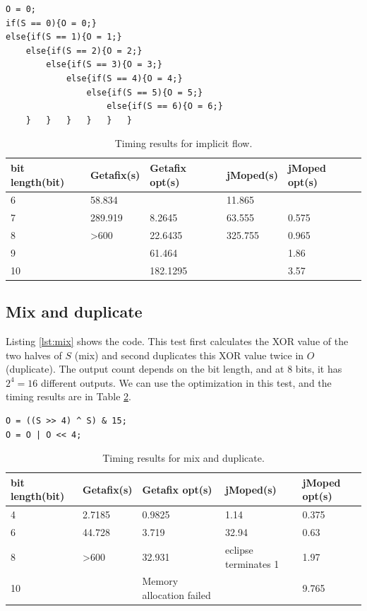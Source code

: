 \lstset{language=C}  
\begin{lstlisting}[float=h, caption={Implict flow test program.},label=lst:implicit]
O = 0;
if(S == 0){O = 0;}
else{if(S == 1){O = 1;}
	else{if(S == 2){O = 2;}
		else{if(S == 3){O = 3;}
			else{if(S == 4){O = 4;}
				else{if(S == 5){O = 5;}
					else{if(S == 6){O = 6;}
	}	}	}	}	}	}
\end{lstlisting}

\begin{table}[htbp]
\begin{tabular}{|l|l|l|l|l|}
\hline
{bit length(bit)} & Getafix(s) & {Getafix opt(s)} & jMoped(s) & {jMoped opt(s)} \\ \hline
6 & {58.834} & {} & {11.865} & {} \\ \hline
7 & {289.919} & 8.2645 & {63.555} & 0.575 \\ \hline
8 & \textgreater 600 & 22.6435 & {325.755} & 0.965 \\ \hline
9 &  & 61.464 &  & 1.86 \\ \hline
10 &  & 182.1295 &  & 3.57 \\ \hline
\end{tabular}
\caption{Timing results for implicit flow.}
\label{tbl:implicit}
\end{table}

\subsection{Mix and duplicate}
Listing \ref{lst:mix} shows the code. This test first calculates the XOR value of the two halves of $S$ (mix) and second duplicates this XOR value twice in $O$ (duplicate). The output count depends on the bit length, and at $8$ bits, it has $2^{4} = 16$ different outputs. We can use the optimization in this test, and the timing results are in Table \ref{tbl:mix}.

\lstset{language=C}  
\begin{lstlisting}[float=h, caption={Mix and duplicate test program at 8 bits.},label=lst:mix]
O = ((S >> 4) ^ S) & 15;
O = O | O << 4;
\end{lstlisting}

\begin{table}[htbp]
\begin{tabular}{|l|l|l|l|l|}
\hline
{bit length(bit)} & Getafix(s) & {Getafix opt(s)} & jMoped(s) & {jMoped opt(s)} \\ \hline
4 & {2.7185} & 0.9825 & {1.14} & 0.375 \\ \hline
6 & {44.728} & 3.719 & {32.94} & 0.63 \\ \hline
8 & \textgreater 600 & 32.931 & eclipse terminates 1 & 1.97 \\ \hline
10 &  & {Memory allocation failed} &  & 9.765 \\ \hline
\end{tabular}
\caption{Timing results for mix and duplicate.}
\label{tbl:mix}
\end{table}

